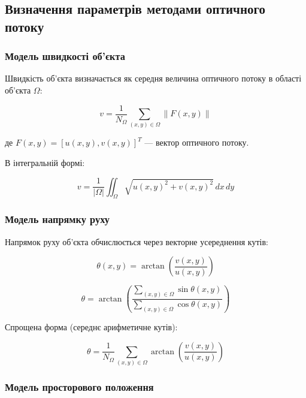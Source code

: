 \documentclass[14pt, a4paper]{extarticle}
\numberwithin{equation}{section}
\begin{document}
\subsection{Визначення параметрів методами оптичного потоку}

\subsubsection{Модель швидкості об'єкта}

Швидкість об'єкта визначається як середня величина оптичного потоку в області об'єкта $\Omega$:

\begin{equation}
\boxed{v = \frac{1}{N_\Omega} \sum_{(x,y) \in \Omega} \|F(x,y)\|} \tag{3.17}
\end{equation}

де $F(x,y) = [u(x,y), v(x,y)]^T$ — вектор оптичного потоку.

В інтегральній формі:

\begin{equation}
v = \frac{1}{|\Omega|} \iint_{\Omega} \sqrt{u(x,y)^2 + v(x,y)^2} \, dx\,dy \tag{3.18}
\end{equation}

\subsubsection{Модель напрямку руху}

Напрямок руху об'єкта обчислюється через векторне усереднення кутів:

\begin{equation}
\theta(x,y) = \arctan\left( \frac{v(x,y)}{u(x,y)} \right) \tag{3.19}
\end{equation}

\begin{equation}
\boxed{\theta = \arctan\left( \frac{\sum_{(x,y) \in \Omega} \sin\theta(x,y)}{\sum_{(x,y) \in \Omega} \cos\theta(x,y)} \right)} \tag{3.20}
\end{equation}

Спрощена форма (середнє арифметичне кутів):

\begin{equation}
\theta = \frac{1}{N_\Omega} \sum_{(x,y) \in \Omega} \arctan\left( \frac{v(x,y)}{u(x,y)} \right) \tag{3.21}
\end{equation}

\subsubsection{Модель просторового положення}
\end{document}
